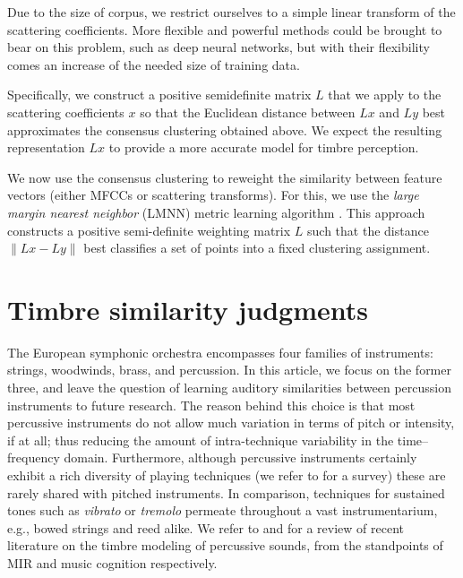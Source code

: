 \documentclass{bmcart}
\makeatletter
\newcommand*{\eg}{e.g.,\@\xspace}
\makeatother
\begin{document}
Due to the size of corpus, we restrict ourselves to a simple linear transform of the scattering coefficients. More flexible and powerful methods could be brought to bear on this problem, such as deep neural networks, but with their flexibility comes an increase of the needed size of training data.

Specifically, we construct a positive semidefinite matrix $L$ that we apply to the scattering coefficients $x$ so that the Euclidean distance between $Lx$ and $Ly$ best approximates the consensus clustering obtained above.
We expect the resulting representation $Lx$ to provide a more accurate model for timbre perception.

We now use the consensus clustering to reweight the similarity between feature vectors (either MFCCs or scattering transforms).
For this, we use the \emph{large margin nearest neighbor} (LMNN) metric learning algorithm \cite{weinberger2006distance, weinberger2009distance}.
This approach constructs a positive semi-definite weighting matrix $L$ such that the distance $\|Lx - Ly\|$ best classifies a set of points into a fixed clustering assignment.


\section*{Timbre similarity judgments}
\label{sec:survey}

The European symphonic orchestra encompasses four families of instruments: strings, woodwinds, brass, and percussion.
In this article, we focus on the former three, and leave the question of learning auditory similarities between percussion instruments to future research.
The reason behind this choice is that most percussive instruments do not allow much variation in terms of pitch or intensity, if at all; thus reducing the amount of intra-technique variability in the time--frequency domain.
Furthermore, although percussive instruments certainly exhibit a rich diversity of playing techniques (we refer to \cite{peinkofer1976book} for a survey) these are rarely shared with pitched instruments.
In comparison, techniques for sustained tones such as \emph{vibrato} or \emph{tremolo} permeate throughout a vast instrumentarium, \eg{} bowed strings and reed alike.
We refer to \cite{x} and \cite{x} for a review of recent literature on the timbre modeling of percussive sounds, from the standpoints of MIR and music cognition respectively. %
\end{document}
